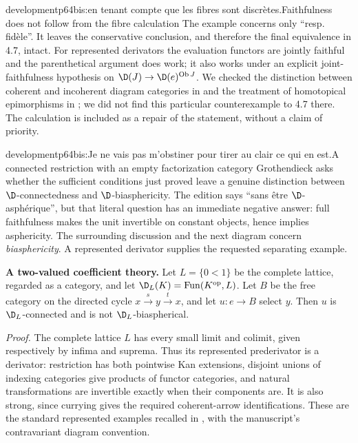 \begin{dcomment}{development}{p64bis:en tenant compte que les fibres sont discrètes.}{Faithfulness does not follow from the fibre calculation}
The example concerns only ``resp. fidèle''. It leaves the conservative conclusion, and therefore the final equivalence in 4.7, intact. For represented derivators the evaluation functors are jointly faithful and the parenthetical argument does work; it also works under an explicit joint-faithfulness hypothesis on $\D(J)\to\D(e)^{\operatorname{Ob}J}$. We checked the distinction between coherent and incoherent diagram categories in \citet[Introduction and Definition 1.5]{Groth2013} and the treatment of homotopical epimorphisms in \citet[\S6]{GrothStovicek2016Trees}; we did not find this particular counterexample to 4.7 there. The calculation is included as a repair of the statement, without a claim of priority.
\end{dcomment}

\begin{dcomment}{development}{p64bis:Je ne vais pas m'obstiner pour tirer au clair ce qui en est.}{A connected restriction with an empty factorization category}
Grothendieck asks whether the sufficient conditions just proved leave a genuine distinction between $\D$-connectedness and $\D$-biasphericity. The edition says ``sans être $\D$-asphérique'', but that literal question has an immediate negative answer: full faithfulness makes the unit invertible on constant objects, hence implies asphericity. The surrounding discussion and the next diagram concern \emph{biasphericity}. A represented derivator supplies the requested separating example.

\textbf{A two-valued coefficient theory.}\ours{}
Let $L=\{0<1\}$ be the complete lattice, regarded as a category, and let $\D_L(K)=\operatorname{Fun}(K^{\mathrm{op}},L)$. Let $B$ be the free category on the directed cycle $x\xrightarrow{s}y\xrightarrow{t}x$, and let $u:e\to B$ select $y$. Then $u$ is $\D_L$-connected and is not $\D_L$-biaspherical.

\emph{Proof.} The complete lattice $L$ has every small limit and colimit, given respectively by infima and suprema. Thus its represented prederivator is a derivator: restriction has both pointwise Kan extensions, disjoint unions of indexing categories give products of functor categories, and natural transformations are invertible exactly when their components are. It is also strong, since currying gives the required coherent-arrow identifications. These are the standard represented examples recalled in \citet[Examples 1.2(1), 1.6 and Definitions 1.5, 1.8]{Groth2013}, with the manuscript's contravariant diagram convention.


\end{dcomment}
